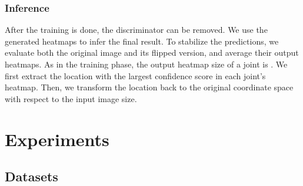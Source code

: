\documentclass[10pt,twocolumn,letterpaper]{article}
\begin{document}
\subsubsection{Inference}

After the training is done, the discriminator can be removed. We use the generated heatmaps  to infer the final result. To stabilize the predictions, we evaluate both the original image and its flipped version, and average their output heatmaps. As in the training phase, the output heatmap size of a joint is . We first extract the location with the largest confidence score in each joint's heatmap. Then, we transform the location back to the original coordinate space with respect to the input image size.  



\section{Experiments}

\subsection{Datasets}
\end{document}
